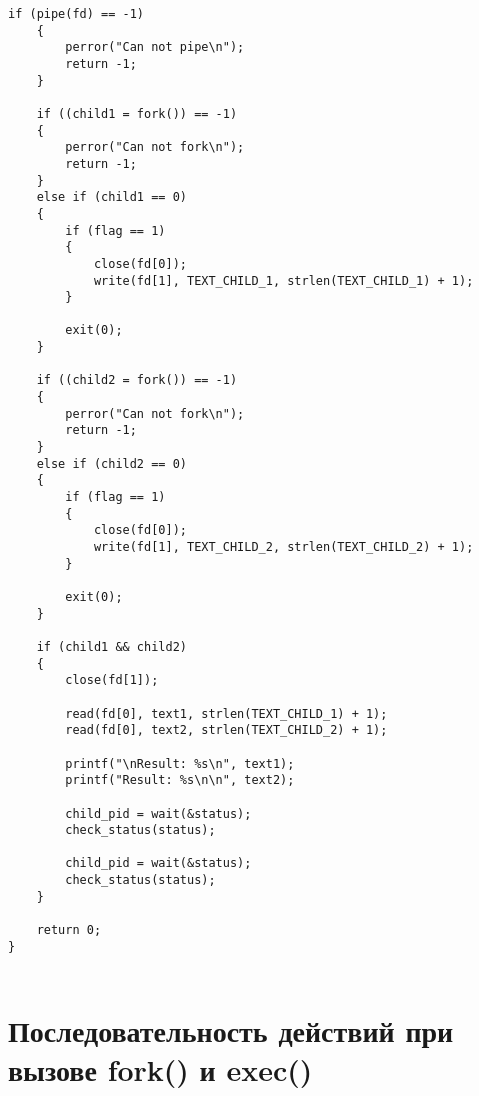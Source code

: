 \begin{lstlisting}[style={asm},label=lst:signal,caption=Использование signal()]
    if (pipe(fd) == -1)
    {
        perror("Can not pipe\n");
        return -1;
    }

    if ((child1 = fork()) == -1)
    {
        perror("Can not fork\n");
        return -1;
    }
    else if (child1 == 0)
    {
        if (flag == 1)
        {
            close(fd[0]);
            write(fd[1], TEXT_CHILD_1, strlen(TEXT_CHILD_1) + 1);
        }

        exit(0);
    }

    if ((child2 = fork()) == -1)
    {
        perror("Can not fork\n");
        return -1;
    }
    else if (child2 == 0)
    {
        if (flag == 1)
        {
            close(fd[0]);
            write(fd[1], TEXT_CHILD_2, strlen(TEXT_CHILD_2) + 1);
        }

        exit(0);
    }

    if (child1 && child2)
    {
        close(fd[1]);
        
        read(fd[0], text1, strlen(TEXT_CHILD_1) + 1);
        read(fd[0], text2, strlen(TEXT_CHILD_2) + 1);

        printf("\nResult: %s\n", text1);
        printf("Result: %s\n\n", text2);

        child_pid = wait(&status);
        check_status(status);

        child_pid = wait(&status);
        check_status(status);
    }

    return 0;
}


\end{lstlisting} 





\clearpage
\section*{Последовательность действий при вызове fork() и exec()}


